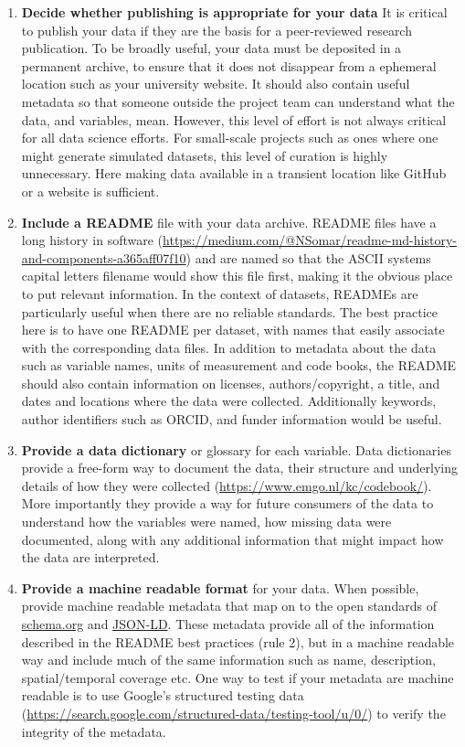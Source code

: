 \documentclass[
]{article}
\begin{document}
\begin{enumerate}
\def\labelenumi{\arabic{enumi}.}
\item
  \textbf{Decide whether publishing is appropriate for your data}
  It is critical to publish your data if they are the basis for a peer-reviewed research publication. To be broadly useful, your data must be deposited in a permanent archive, to ensure that it does not disappear from a ephemeral location such as your university website. It should also contain useful metadata so that someone outside the project team can understand what the data, and variables, mean. However, this level of effort is not always critical for all data science efforts. For small-scale projects such as ones where one might generate simulated datasets, this level of curation is highly unnecessary. Here making data available in a transient location like GitHub or a website is sufficient.
\item
  \textbf{Include a README} file with your data archive. README files have a long history in software (\url{https://medium.com/@NSomar/readme-md-history-and-components-a365aff07f10}) and are named so that the ASCII systems capital letters filename would show this file first, making it the obvious place to put relevant information. In the context of datasets, READMEs are particularly useful when there are no reliable standards. The best practice here is to have one README per dataset, with names that easily associate with the corresponding data files. In addition to metadata about the data such as variable names, units of measurement and code books, the README should also contain information on licenses, authors/copyright, a title, and dates and locations where the data were collected. Additionally keywords, author identifiers such as ORCID, and funder information would be useful.
\item
  \textbf{Provide a data dictionary} or glossary for each variable. Data dictionaries provide a free-form way to document the data, their structure and underlying details of how they were collected (\url{https://www.emgo.nl/kc/codebook/}). More importantly they provide a way for future consumers of the data to understand how the variables were named, how missing data were documented, along with any additional information that might impact how the data are interpreted.
\item
  \textbf{Provide a machine readable format} for your data. When possible, provide machine readable metadata that map on to the open standards of \href{https://schema.org/}{schema.org} and \href{https://en.wikipedia.org/wiki/JSON-LD}{JSON-LD}. These metadata provide all of the information described in the README best practices (rule 2), but in a machine readable way and include much of the same information such as name, description, spatial/temporal coverage etc. One way to test if your metadata are machine readable is to use Google's structured testing data (\url{https://search.google.com/structured-data/testing-tool/u/0/}) to verify the integrity of the metadata.

\end{enumerate}
\end{document}
